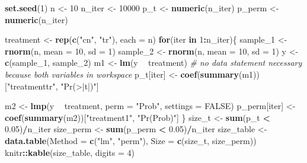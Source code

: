 \documentclass[]{book}
\newenvironment{Shaded}{\begin{snugshade}}{\end{snugshade}}
\newcommand{\CommentTok}[1]{\textcolor[rgb]{0.56,0.35,0.01}{\textit{#1}}}
\newcommand{\ControlFlowTok}[1]{\textcolor[rgb]{0.13,0.29,0.53}{\textbf{#1}}}
\newcommand{\DataTypeTok}[1]{\textcolor[rgb]{0.13,0.29,0.53}{#1}}
\newcommand{\DecValTok}[1]{\textcolor[rgb]{0.00,0.00,0.81}{#1}}
\newcommand{\FloatTok}[1]{\textcolor[rgb]{0.00,0.00,0.81}{#1}}
\newcommand{\KeywordTok}[1]{\textcolor[rgb]{0.13,0.29,0.53}{\textbf{#1}}}
\newcommand{\NormalTok}[1]{#1}
\newcommand{\OperatorTok}[1]{\textcolor[rgb]{0.81,0.36,0.00}{\textbf{#1}}}
\newcommand{\OtherTok}[1]{\textcolor[rgb]{0.56,0.35,0.01}{#1}}
\newcommand{\StringTok}[1]{\textcolor[rgb]{0.31,0.60,0.02}{#1}}
\begin{document}
\begin{Shaded}
\begin{Highlighting}[]
\KeywordTok{set.seed}\NormalTok{(}\DecValTok{1}\NormalTok{)}
\NormalTok{n <-}\StringTok{ }\DecValTok{10}
\NormalTok{n_iter <-}\StringTok{ }\DecValTok{10000}
\NormalTok{p_t <-}\StringTok{ }\KeywordTok{numeric}\NormalTok{(n_iter)}
\NormalTok{p_perm <-}\StringTok{ }\KeywordTok{numeric}\NormalTok{(n_iter)}

\NormalTok{treatment <-}\StringTok{ }\KeywordTok{rep}\NormalTok{(}\KeywordTok{c}\NormalTok{(}\StringTok{"cn"}\NormalTok{, }\StringTok{"tr"}\NormalTok{), }\DataTypeTok{each =}\NormalTok{ n)}
\ControlFlowTok{for}\NormalTok{(iter }\ControlFlowTok{in} \DecValTok{1}\OperatorTok{:}\NormalTok{n_iter)\{}
\NormalTok{  sample_}\DecValTok{1}\NormalTok{ <-}\StringTok{ }\KeywordTok{rnorm}\NormalTok{(n, }\DataTypeTok{mean =} \DecValTok{10}\NormalTok{, }\DataTypeTok{sd =} \DecValTok{1}\NormalTok{)}
\NormalTok{  sample_}\DecValTok{2}\NormalTok{ <-}\StringTok{ }\KeywordTok{rnorm}\NormalTok{(n, }\DataTypeTok{mean =} \DecValTok{10}\NormalTok{, }\DataTypeTok{sd =} \DecValTok{1}\NormalTok{)}
\NormalTok{  y <-}\StringTok{ }\KeywordTok{c}\NormalTok{(sample_}\DecValTok{1}\NormalTok{, sample_}\DecValTok{2}\NormalTok{)}
\NormalTok{  m1 <-}\StringTok{ }\KeywordTok{lm}\NormalTok{(y }\OperatorTok{~}\StringTok{ }\NormalTok{treatment) }\CommentTok{# no data statement necessary because both variables in workspace}
\NormalTok{  p_t[iter] <-}\StringTok{ }\KeywordTok{coef}\NormalTok{(}\KeywordTok{summary}\NormalTok{(m1))[}\StringTok{"treatmenttr"}\NormalTok{, }\StringTok{"Pr(>|t|)"}\NormalTok{]}
  
\NormalTok{  m2 <-}\StringTok{ }\KeywordTok{lmp}\NormalTok{(y }\OperatorTok{~}\StringTok{ }\NormalTok{treatment,}
            \DataTypeTok{perm =} \StringTok{"Prob"}\NormalTok{,}
            \DataTypeTok{settings =} \OtherTok{FALSE}\NormalTok{)}
\NormalTok{  p_perm[iter] <-}\StringTok{ }\KeywordTok{coef}\NormalTok{(}\KeywordTok{summary}\NormalTok{(m2))[}\StringTok{"treatment1"}\NormalTok{, }\StringTok{"Pr(Prob)"}\NormalTok{]}
\NormalTok{\}}
\NormalTok{size_t <-}\StringTok{ }\KeywordTok{sum}\NormalTok{(p_t }\OperatorTok{<}\StringTok{ }\FloatTok{0.05}\NormalTok{)}\OperatorTok{/}\NormalTok{n_iter}
\NormalTok{size_perm <-}\StringTok{ }\KeywordTok{sum}\NormalTok{(p_perm }\OperatorTok{<}\StringTok{ }\FloatTok{0.05}\NormalTok{)}\OperatorTok{/}\NormalTok{n_iter}
\NormalTok{size_table <-}\StringTok{ }\KeywordTok{data.table}\NormalTok{(}\DataTypeTok{Method =} \KeywordTok{c}\NormalTok{(}\StringTok{"lm"}\NormalTok{, }\StringTok{"perm"}\NormalTok{),}
                         \DataTypeTok{Size =} \KeywordTok{c}\NormalTok{(size_t, size_perm))}
\NormalTok{knitr}\OperatorTok{::}\KeywordTok{kable}\NormalTok{(size_table, }\DataTypeTok{digits =} \DecValTok{4}\NormalTok{)}
\end{Highlighting}
\end{Shaded}
\end{document}
